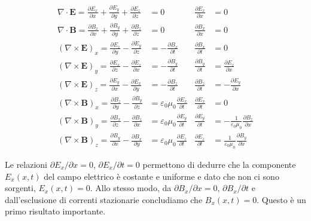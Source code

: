\begin{align}
\nabla \cdot \mathbf{E} = \frac{\partial E_x}{\partial x} + \frac{\partial E_y}{\partial y} + \frac{\partial E_z}{\partial z} &= 0 & \frac{\partial E_x}{\partial x} &= 0 \\[10pt]
\nabla \cdot \mathbf{B} = \frac{\partial B_x}{\partial x} + \frac{\partial B_y}{\partial y} + \frac{\partial B_z}{\partial z} &= 0 & \frac{\partial B_x}{\partial x} &= 0 \\[10pt]
(\nabla \times \mathbf{E})_x = \frac{\partial E_z}{\partial y} - \frac{\partial E_y}{\partial z} &= -\frac{\partial B_x}{\partial t} & \frac{\partial B_x}{\partial t} &= 0 \\[10pt]
(\nabla \times \mathbf{E})_y = \frac{\partial E_x}{\partial z} - \frac{\partial E_z}{\partial x} &= -\frac{\partial B_y}{\partial t} & \frac{\partial B_y}{\partial t} &= \frac{\partial E_z}{\partial x} \label{eq: 4} \\[10pt] 
(\nabla \times \mathbf{E})_z = \frac{\partial E_y}{\partial x} - \frac{\partial E_x}{\partial y} &= -\frac{\partial B_z}{\partial t} & \frac{\partial B_z}{\partial t} &= -\frac{\partial E_y}{\partial x} \label{eq: 5}\\[10pt]
(\nabla \times \mathbf{B})_x = \frac{\partial B_z}{\partial y} - \frac{\partial B_y}{\partial z} &= \varepsilon_0 \mu_0 \frac{\partial E_x}{\partial t} & \frac{\partial E_x}{\partial t} &= 0 \\[10pt]
(\nabla \times \mathbf{B})_y = \frac{\partial B_x}{\partial z} - \frac{\partial B_z}{\partial x} &= \varepsilon_0 \mu_0 \frac{\partial E_y}{\partial t} & \frac{\partial E_y}{\partial t} &= -\frac{1}{\varepsilon_0 \mu_0}\frac{\partial B_z}{\partial x} \label{eq: 7} \\[10pt]
(\nabla \times \mathbf{B})_z = \frac{\partial B_y}{\partial x} - \frac{\partial B_x}{\partial y} &= \varepsilon_0 \mu_0 \frac{\partial E_z}{\partial t} & \frac{\partial E_z}{\partial t} &= \frac{1}{\varepsilon_0 \mu_0}\frac{\partial B_y}{\partial x} \label{eq: 8}
\end{align}

Le relazioni $\partial E_x/ \partial x = 0$, $\partial E_x/\partial t = 0$ permettono di dedurre che la componente $E_x(x,t)$ del campo elettrico è costante e uniforme e dato che non ci sono sorgenti, $E_x (x,t)= 0$. Allo stesso modo, da $\partial B_x/\partial x = 0$, $\partial B_x/\partial t$ e dall'esclusione di correnti stazionarie concludiamo che $B_x(x,t) = 0$. Questo è un primo risultato importante. \\

